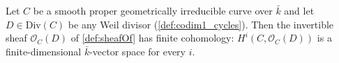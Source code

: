 \begin{theorem}
  \label{thm:HModule_lineBundle_finite}
  Let \(C\) be a smooth proper geometrically irreducible curve over
  \(\bar k\) and let \(D \in \mathrm{Div}(C)\) be any Weil divisor
  (\cref{def:codim1_cycles}). Then the invertible sheaf
  \(\mathcal O_C(D)\) of \cref{def:sheafOf} has finite cohomology:
  \(H^i(C, \mathcal O_C(D))\) is a finite-dimensional \(\bar k\)-vector
  space for every \(i\).

\end{theorem}

